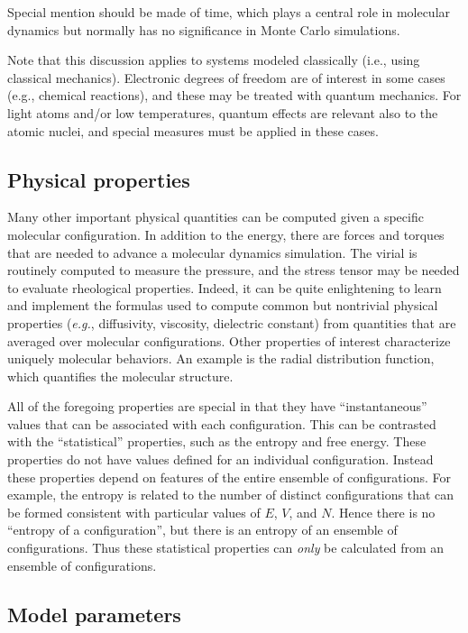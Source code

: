 \documentclass[9pt,bestpractices]{molsim}
\begin{document}
Special mention should be made of time, which plays a central role in
molecular dynamics but normally has no significance in Monte Carlo
simulations.

Note that this discussion applies to systems modeled
classically (i.e., using classical mechanics). Electronic degrees of freedom
are of interest in some cases (e.g., chemical reactions), and these may be 
treated with quantum mechanics. For light atoms and/or low temperatures, 
quantum effects are relevant also to the atomic nuclei, and special measures
must be applied in these cases.

\subsection{Physical properties}\label{properties}

Many other important physical quantities can be computed given a specific
molecular configuration. In addition to the energy, there are forces and
torques that are needed to advance a molecular dynamics simulation. The
virial is routinely computed to measure the pressure, and the stress
tensor may be needed to evaluate rheological properties. Indeed, it can
be quite enlightening to learn and implement the formulas used to
compute common but nontrivial physical properties (\emph{e.g.},
diffusivity, viscosity, dielectric constant) from quantities that are
averaged over molecular configurations. Other properties of interest
characterize uniquely molecular behaviors. An example is the radial
distribution function, which quantifies the molecular structure.

All of the foregoing properties are special in that they have
``instantaneous'' values that can be associated with each configuration.
This can be contrasted with the ``statistical'' properties, such as the
entropy and free energy. These properties do not have values
defined for an individual configuration. Instead these properties depend
on features of the entire ensemble of configurations. For example, the
entropy is related to the number of distinct configurations that can be
formed consistent with particular values of $E$, $V$, and $N$. Hence there is
no ``entropy of a configuration'', but there is an entropy of an
ensemble of configurations.
Thus these statistical properties can \emph{only} be calculated from an ensemble of configurations.

\subsection{Model parameters}\label{model-parameters}
\end{document}
